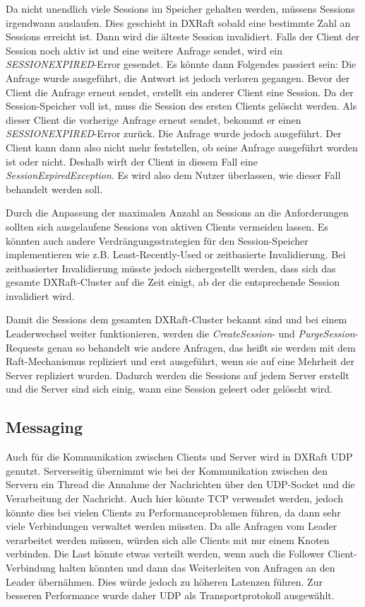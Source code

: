 Da nicht unendlich viele Sessions im Speicher gehalten werden, müssens Sessions irgendwann auslaufen. Dies geschieht in DXRaft sobald eine bestimmte Zahl an Sessions erreicht ist. Dann wird die älteste Session invalidiert. Falls der Client der Session noch aktiv ist und eine weitere Anfrage sendet, wird ein \textit{SESSION\textunderscore EXPIRED}-Error gesendet. Es könnte dann Folgendes passiert sein: Die Anfrage wurde ausgeführt, die Antwort ist jedoch verloren gegangen. Bevor der Client die Anfrage erneut sendet, erstellt ein anderer Client eine Session. Da der Session-Speicher voll ist, muss die Session des ersten Clients gelöscht werden. Als dieser Client die vorherige Anfrage erneut sendet, bekommt er einen \textit{SESSION\textunderscore EXPIRED}-Error zurück. Die Anfrage wurde jedoch ausgeführt. Der Client kann dann also nicht mehr feststellen, ob seine Anfrage ausgeführt worden ist oder nicht. Deshalb wirft der Client in diesem Fall eine \textit{SessionExpiredException}. Es wird also dem Nutzer überlassen, wie dieser Fall behandelt werden soll. 

Durch die Anpassung der maximalen Anzahl an Sessions an die Anforderungen sollten sich ausgelaufene Sessions von aktiven Clients vermeiden lassen. Es könnten auch andere Verdrängungsstrategien für den Session-Speicher implementieren wie z.B. Least-Recently-Used or zeitbasierte Invalidierung. Bei zeitbasierter Invalidierung müsste jedoch sichergestellt werden, dass sich das gesamte DXRaft-Cluster auf die Zeit einigt, ab der die entsprechende Session invalidiert wird.

Damit die Sessions dem gesamten DXRaft-Cluster bekannt sind und bei einem Leaderwechsel weiter funktionieren, werden die \textit{CreateSession}- und \textit{PurgeSession}-Requests genau so behandelt wie andere Anfragen, das heißt sie werden mit dem Raft-Mechanismus repliziert und erst ausgeführt, wenn sie auf eine Mehrheit der Server repliziert wurden. Dadurch werden die Sessions auf jedem Server erstellt und die Server sind sich einig, wann eine Session geleert oder gelöscht wird.

\subsection{Messaging}
\label{client-messaging}

Auch für die Kommunikation zwischen Clients und Server wird in DXRaft UDP genutzt. Serverseitig übernimmt wie bei der Kommunikation zwischen den Servern ein Thread die Annahme der Nachrichten über den UDP-Socket und die Verarbeitung der Nachricht. Auch hier könnte TCP verwendet werden, jedoch könnte dies bei vielen Clients zu Performanceproblemen führen, da dann sehr viele Verbindungen verwaltet werden müssten. Da alle Anfragen vom Leader verarbeitet werden müssen, würden sich alle Clients mit nur einem Knoten verbinden. Die Last könnte etwas verteilt werden, wenn auch die Follower Client-Verbindung halten könnten und dann das Weiterleiten von Anfragen an den Leader übernähmen. Dies würde jedoch zu höheren Latenzen führen. Zur besseren Performance wurde daher UDP als Transportprotokoll ausgewählt.

